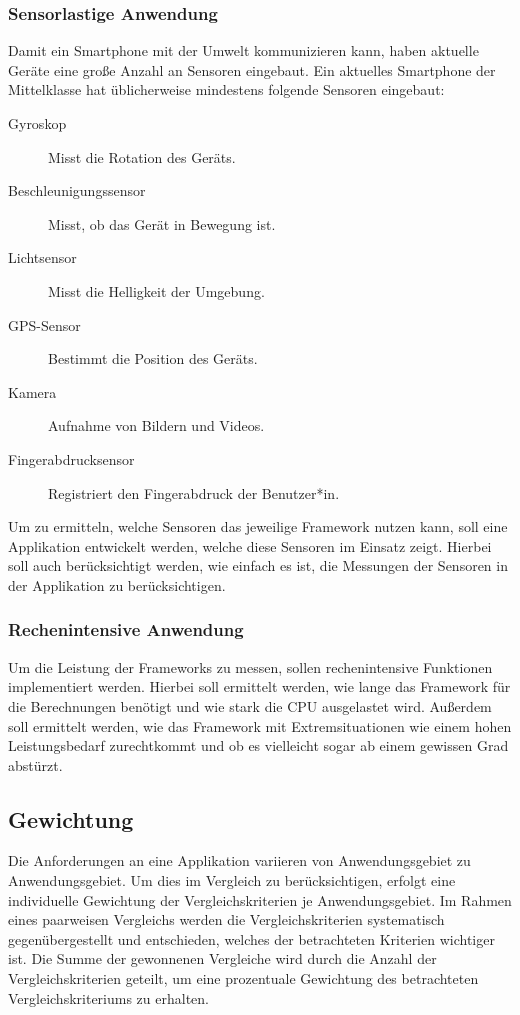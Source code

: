 \documentclass[]{lni}
\begin{document}
\subsubsection*{Sensorlastige Anwendung}
Damit ein Smartphone mit der Umwelt kommunizieren kann, haben aktuelle Geräte eine große Anzahl an Sensoren eingebaut. Ein aktuelles Smartphone der Mittelklasse hat üblicherweise mindestens folgende Sensoren eingebaut:
\begin{description}
	\item[Gyroskop] Misst die Rotation des Geräts.
	\item[Beschleunigungssensor] Misst, ob das Gerät in Bewegung ist.
	\item[Lichtsensor] Misst die Helligkeit der Umgebung.
	\item[GPS-Sensor] Bestimmt die Position des Geräts.
	\item[Kamera] Aufnahme von Bildern und Videos.
	\item[Fingerabdrucksensor] Registriert den Fingerabdruck der Benutzer*in.
\end{description}
Um zu ermitteln, welche Sensoren das jeweilige Framework nutzen kann, soll eine Applikation entwickelt werden, welche diese Sensoren im Einsatz zeigt. Hierbei soll auch berücksichtigt werden, wie einfach es ist, die Messungen der Sensoren in der Applikation zu berücksichtigen.

\subsubsection*{Rechenintensive Anwendung}
Um die Leistung der Frameworks zu messen, sollen rechenintensive Funktionen implementiert werden. Hierbei soll ermittelt werden, wie lange das Framework für die Berechnungen benötigt und wie stark die CPU ausgelastet wird. Außerdem soll ermittelt werden, wie das Framework mit Extremsituationen wie einem hohen Leistungsbedarf zurechtkommt und ob es vielleicht sogar ab einem gewissen Grad abstürzt.

\subsection{Gewichtung} \label{sec:gewichtung}
Die Anforderungen an eine Applikation variieren von Anwendungsgebiet zu Anwendungsgebiet. Um dies im Vergleich zu berücksichtigen, erfolgt eine individuelle Gewichtung der Vergleichskriterien je Anwendungsgebiet. Im Rahmen eines paarweisen Vergleichs werden die Vergleichskriterien systematisch gegenübergestellt und entschieden, welches der betrachteten Kriterien wichtiger ist. Die Summe der gewonnenen Vergleiche wird durch die Anzahl der Vergleichskriterien geteilt, um eine prozentuale Gewichtung des betrachteten Vergleichskriteriums zu erhalten.
\end{document}
